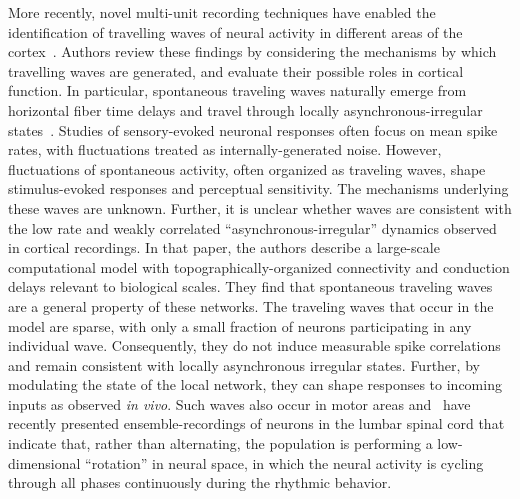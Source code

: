 \documentclass[brainsci, %
               review,submit,pdftex,moreauthors
               ]{Definitions/mdpi}
\begin{document}
More recently, novel multi-unit recording techniques have enabled the identification of travelling waves of neural activity in different areas of the cortex~\citep{muller_cortical_2018}. Authors review these findings by considering the mechanisms by which travelling waves are generated, and evaluate their possible roles in cortical function. In particular, spontaneous traveling waves naturally emerge from horizontal fiber time delays and travel through locally asynchronous-irregular states~\citep{davis_spontaneous_2021}. Studies of sensory-evoked neuronal responses often focus on mean spike rates, with fluctuations treated as internally-generated noise. However, fluctuations of spontaneous activity, often organized as traveling waves, shape stimulus-evoked responses and perceptual sensitivity. The mechanisms underlying these waves are unknown. Further, it is unclear whether waves are consistent with the low rate and weakly correlated ``asynchronous-irregular'' dynamics observed in cortical recordings. In that paper, the authors describe a large-scale computational model with topographically-organized connectivity and conduction delays relevant to biological scales. They find that spontaneous traveling waves are a general property of these networks. The traveling waves that occur in the model are sparse, with only a small fraction of neurons participating in any individual wave. Consequently, they do not induce measurable spike correlations and remain consistent with locally asynchronous irregular states. Further, by modulating the state of the local network, they can shape responses to incoming inputs as observed \textit{in vivo}. Such waves also occur in motor areas and~\citet{linden_movement_2021} have recently presented ensemble-recordings of neurons in the lumbar spinal cord that indicate that, rather than alternating, the population is performing a low-dimensional ``rotation'' in neural space, in which the neural activity is cycling through all phases continuously during the rhythmic behavior.
\end{document}
